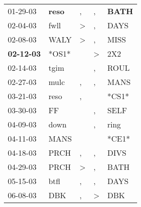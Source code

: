 \begin{supertabular}{p{0.07\textwidth}p{0.06\textwidth}p{0.02\textwidth}p{0.02\textwidth}p{0.06\textwidth}}
          01-29-03\textsuperscript{} &  \textbf{reso\textsuperscript{}} &                , &                , &  \textbf{BATH\textsuperscript{}} \\
          02-04-03\textsuperscript{} &           fwll\textsuperscript{} &     \textgreater &                , &           DAYS\textsuperscript{} \\
          02-08-03\textsuperscript{} &           WALY\textsuperscript{} &     \textgreater &                , &           MISS\textsuperscript{} \\
 \textbf{02-12-03\textsuperscript{}} &                            *OS1* &                  &     \textgreater &            2X2\textsuperscript{} \\
          02-14-03\textsuperscript{} &           tgim\textsuperscript{} &                  &                , &           ROUL\textsuperscript{} \\
          02-27-03\textsuperscript{} &           mulc\textsuperscript{} &                , &                , &           MANS\textsuperscript{} \\
          03-21-03\textsuperscript{} &           reso\textsuperscript{} &                , &                  &                            *CS1* \\
          03-30-03\textsuperscript{} &             FF\textsuperscript{} &                  &                , &           SELF\textsuperscript{} \\
          04-09-03\textsuperscript{} &           down\textsuperscript{} &                  &                , &           ring\textsuperscript{} \\
          04-11-03\textsuperscript{} &           MANS\textsuperscript{} &                  &                  &                            *CE1* \\
          04-18-03\textsuperscript{} &           PRCH\textsuperscript{} &                , &                , &           DIVS\textsuperscript{} \\
          04-29-03\textsuperscript{} &           PRCH\textsuperscript{} &     \textgreater &                , &           BATH\textsuperscript{} \\
          05-15-03\textsuperscript{} &           btfl\textsuperscript{} &                , &                , &           DAYS\textsuperscript{} \\
          06-08-03\textsuperscript{} &            DBK\textsuperscript{} &                , &     \textgreater &            DBK\textsuperscript{} \\

\end{supertabular}
